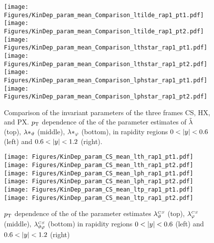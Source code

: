 \newcommand{\lamthPX}{\lambda^{\scriptscriptstyle PX}_\vartheta}
\newcommand{\lamphPX}{\lambda^{\scriptscriptstyle PX}_\varphi}
\newcommand{\lamthphPX}{\lambda^{\scriptscriptstyle PX}_{\vartheta \varphi}}
\newcommand{\lamtildePX}{\tilde{\lambda}^{\scriptscriptstyle PX}}
\newcommand{\lamthstarPX}{\lambda^{* \scriptscriptstyle PX}_\vartheta}
\newcommand{\lamphstarPX}{\lambda^{* \scriptscriptstyle PX}_\varphi}


\setlength{\textwidth}{510pt}
\setlength{\hoffset}{-50pt}
\setlength{\voffset}{-50pt}













\begin{figure}[htbp]
\centering
\texttt{[image: Figures/KinDep\_param\_mean\_Comparison\_ltilde\_rap1\_pt1.pdf]}
\texttt{[image: Figures/KinDep\_param\_mean\_Comparison\_ltilde\_rap1\_pt2.pdf]}
\texttt{[image: Figures/KinDep\_param\_mean\_Comparison\_lthstar\_rap1\_pt1.pdf]}
\texttt{[image: Figures/KinDep\_param\_mean\_Comparison\_lthstar\_rap1\_pt2.pdf]}
\texttt{[image: Figures/KinDep\_param\_mean\_Comparison\_lphstar\_rap1\_pt1.pdf]}
\texttt{[image: Figures/KinDep\_param\_mean\_Comparison\_lphstar\_rap1\_pt2.pdf]}
\caption{Comparison of the invariant parameters of the three frames CS, HX,
and PX. $p_\mathrm{T}$ dependence of the of the
parameter estimates of $\tilde{\lambda}$ (top), $\lambda*_\vartheta$ (middle), $\lambda*_\varphi$ (bottom), in rapidity regions $0<\left | y \right |<0.6$ (left) and
$0.6<\left | y \right |<1.2$ (right).}
\end{figure}
\clearpage





\begin{figure}[htbp]
\centering
\texttt{[image: Figures/KinDep\_param\_CS\_mean\_lth\_rap1\_pt1.pdf]}
\texttt{[image: Figures/KinDep\_param\_CS\_mean\_lth\_rap1\_pt2.pdf]}
\texttt{[image: Figures/KinDep\_param\_CS\_mean\_lph\_rap1\_pt1.pdf]}
\texttt{[image: Figures/KinDep\_param\_CS\_mean\_lph\_rap1\_pt2.pdf]}
\texttt{[image: Figures/KinDep\_param\_CS\_mean\_ltp\_rap1\_pt1.pdf]}
\texttt{[image: Figures/KinDep\_param\_CS\_mean\_ltp\_rap1\_pt2.pdf]}
\caption{$p_\mathrm{T}$ dependence of the of the parameter estimates $\lambda^{\scriptscriptstyle CS}_\vartheta$ (top), $\lambda^{\scriptscriptstyle CS}_\varphi$ (middle), $\lambda^{\scriptscriptstyle CS}_{\vartheta \varphi}$ (bottom) in rapidity regions $0<\left | y \right |<0.6$ (left) and $0.6<\left | y \right |<1.2$ (right)}
\end{figure}
\clearpage

